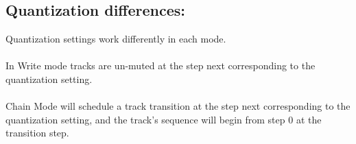 \subsection{Quantization differences:}
Quantization settings work differently in each mode.\\
\\
 In Write mode tracks are un-muted at the step next corresponding to the quantization setting. \\
\\
Chain Mode will schedule a track transition at the step next corresponding to the quantization setting, and the track's sequence will begin from step 0 at the transition step.
 
